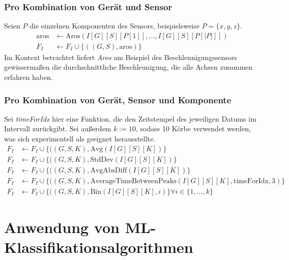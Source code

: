\subsubsection{Pro Kombination von Gerät und Sensor}
Seien $P$ die einzelnen Komponenten des Sensors, beispielsweise $P = \{x, y, z\}$.
\begin{align}
    \text{aros} &\gets \text{Aros}(I[G][S][P[1]], ..., I[G][S][P[|P|]]) \\
    F_I &\gets F_I \cup \{((G, S), \text{aros})\}
\end{align}
Im Kontext betrachtet liefert \textit{Aros} am Beispiel des Beschleunigungssensors gewissermaßen die durchschnittliche Beschleunigung, die alle Achsen zusammen erfahren haben.
\subsubsection{Pro Kombination von Gerät, Sensor und Komponente}
Sei \textit{timeForIdx} hier eine Funktion, die den Zeitstempel des jeweiligen Datums im Intervall zurückgibt. Sei außerdem $k := 10$, sodass 10 Körbe verwendet werden, was sich experimentell als geeignet herausstellte.
\begin{align}
    F_I &\gets F_I \cup \{((G, S, K), \text{Avg}(I[G][S][K])\} \\
    F_I &\gets F_I \cup \{((G, S, K), \text{StdDev}(I[G][S][K])\} \\
    F_I &\gets F_I \cup \{((G, S, K), \text{AvgAbsDiff}(I[G][S][K])\} \\
    F_I &\gets F_I \cup \{((G, S, K), \text{AverageTimeBetweenPeaks}(I[G][S][K], \text{timeForIdx}, 3)\} \\
    F_I &\gets F_I \cup \{((G, S, K), \text{Bin}(I[G][S][K], i)\} \forall i \in \{1, ..., k\}
\end{align}

\section{Anwendung von ML-Klassifikationsalgorithmen}